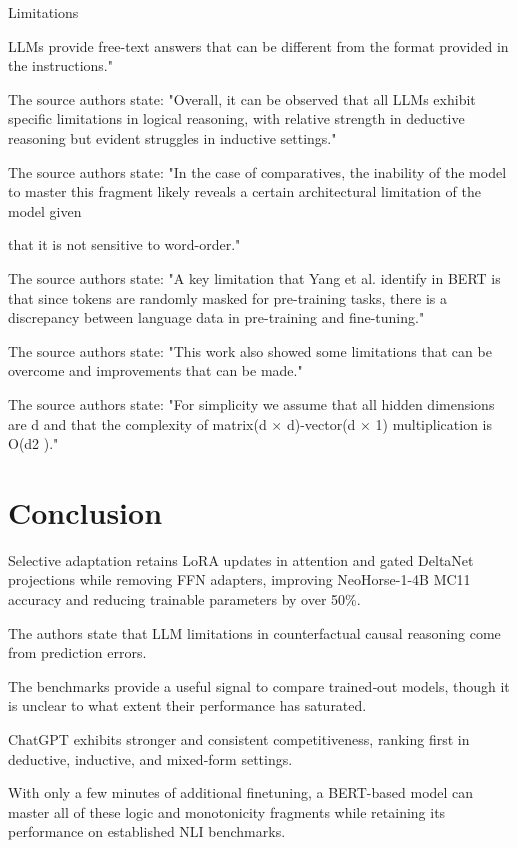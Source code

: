 \documentclass[runningheads]{llncs}
\begin{document}
Limitations

LLMs provide free-text answers that can be different from the format provided in the instructions." \cite{gendron2024counterfactual}

The source authors state: "Overall, it can be observed that all LLMs exhibit specific
limitations in logical reasoning, with relative strength in
deductive reasoning but evident struggles in inductive
settings." \cite{xu2023large}

The source authors state: "In the case of comparatives, the inability of the model to master this fragment likely
reveals a certain architectural limitation of the model given

that it is not sensitive to word-order." \cite{richardson2020probing}

The source authors state: "A key limitation that Yang et al. identify
in BERT is that since tokens are randomly masked for pre-training tasks, there is a discrepancy
between language data in pre-training and fine-tuning." \cite{storks2019recent}

The source authors state: "This work also showed some limitations that can be
overcome and improvements that can be made." \cite{raju2017dynamic}

The source authors state: "For simplicity we assume that all hidden dimensions are d and that the complexity of
matrix(d × d)-vector(d × 1) multiplication is O(d2 )." \cite{parikh2016decomposable}

\section{Conclusion}
Selective adaptation retains LoRA updates in attention and gated DeltaNet projections while removing FFN adapters, improving NeoHorse-1-4B MC11 accuracy and reducing trainable parameters by over 50\%. \cite{mei2026improving}

The authors state that LLM limitations in counterfactual causal reasoning come from prediction errors. \cite{gendron2024counterfactual}

The benchmarks provide a useful signal to compare trained‑out models, though it is unclear to what extent their performance has saturated. \cite{madaan2024lost}

ChatGPT exhibits stronger and consistent competitiveness, ranking first in deductive, inductive, and mixed-form settings. \cite{xu2023large}

With only a few minutes of additional finetuning, a BERT-based model can master all of these logic and monotonicity fragments while retaining its performance on established NLI benchmarks. \cite{richardson2020probing}
\end{document}

